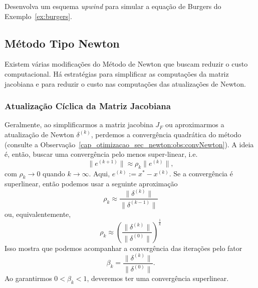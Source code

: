 \begin{exer}
  Desenvolva um esquema \textit{upwind} para simular a equação de Burgers do Exemplo~\ref{ex:burgers}.
\end{exer}

\subsection{Método Tipo Newton}\label{cap_otimizacao_sec_sisnlin_ssec_tipoNewton}
\badgeRevisar

Existem várias modificações do Método de Newton{\newton} que buscam reduzir o custo computacional. Há estratégias para simplificar as computações da matriz jacobiana{\jacobi} e para reduzir o custo nas computações das atualizações de Newton.

\subsubsection{Atualização Cíclica da Matriz Jacobiana}
\badgeRevisar

Geralmente, ao simplificarmos a matriz jacobina $J_F$ ou aproximarmos a atualização de Newton $\delta^{(k)}$, perdemos a convergência quadrática do método (consulte a Observação~\ref{cap_otimizacao_sec_newton:obs:convNewton}). A ideia é, então, buscar uma convergência pelo menos super-linear, i.e.
\begin{equation}
  \|e^{(k+1)}\|\approx \rho_k\|e^{(k)}\|,
\end{equation}
com $\rho_k\to 0$ quando $k\to\infty$. Aqui, $e^{(k)}:=x^*-x^{(k)}$. Se a convergência é superlinear, então podemos usar a seguinte aproximação
\begin{equation}
  \rho_k \approx \frac{\|\delta^{(k)}\|}{\|\delta^{(k-1)}\|}
\end{equation}
ou, equivalentemente,
\begin{equation}
  \rho_k \approx \left(\frac{\|\delta^{(k)}\|}{\|\delta^{(0)}\|}\right)^{\frac{1}{k}}
\end{equation}
Isso mostra que podemos acompanhar a convergência das iterações pelo fator
\begin{equation}
  \beta_k = \frac{\|\delta^{(k)}\|}{\|\delta^{(0)}\|}.
\end{equation}
Ao garantirmos $0<\beta_k<1$, deveremos ter uma convergência superlinear.


